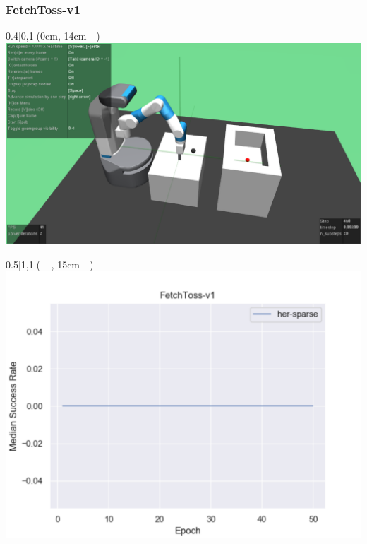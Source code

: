 


\begin{frame}
	\frametitle{FetchToss-v1}	
	\vspace{1cm}
	
	\begin{textblock*}{0.4\paperwidth}[0,1](0cm, 14cm - \PraesentationSeitenrand)%
		\includegraphics[width=0.4\paperwidth]{./Ressourcen/Figures/FetchToss-v1.pdf}
	\end{textblock*}
	
	\begin{textblock*}{0.5\paperwidth}[1,1](\textwidth + \PraesentationSeitenrand, 15cm - \PraesentationSeitenrand)%
		\includegraphics[width=0.5\paperwidth]{./Ressourcen/Figures/fig_FetchToss-v1.pdf}
	\end{textblock*}
	
\end{frame}
\clearpage


